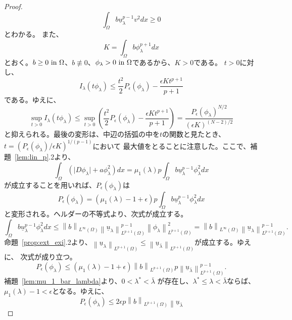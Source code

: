 \begin{proof}
\[ \int_\Omega b
 \underline{u}_\lambda^{p-1} v^2 dx \geq 0
 \]
 とわかる。
 また、
 \begin{equation}
  K = \int_\Omega b \phi_\lambda^{p+1} dx \label{eq:intbphi}
 \end{equation}
 とおく。$b \geq 0 ~\text{in}~ \Omega$、$b \not\equiv 0$、$\phi_\lambda > 0
 ~\text{in}~ \Omega$であるから、$K > 0$である。
 $t > 0$に対し、
 \[
 I_\lambda (t \phi_\lambda) \leq \frac{t^2}{2} P_\epsilon
 (\phi_\lambda) - \frac{\epsilon K t^{p+1}}{p+1}
 \]
 である。ゆえに、
\begin{equation}
 \sup_{t > 0} I_\lambda (t \phi_\lambda) \leq \sup_{t > 0} \left(
                                                            \frac{t^2}{2} P_\epsilon 
 (\phi_\lambda) - \frac{\epsilon K t^{p+1}}{p+1} \right) =  
 \frac{P_\epsilon(\phi_\lambda)^{N/2}}{\left( \epsilon K
                                         \right)^{(N-2)/2}}
 \label{eq:supIlambdatphi1} 
\end{equation}
と抑えられる。最後の変形は、中辺の括弧の中を$t$の関数と見たとき、
$t = ( P_\epsilon(\phi_\lambda) / \epsilon K )^{1/(p-1)}$において
最大値をとることに注意した。ここで、補題~\ref{lem:lin_p}.2より、
\[
 \int_\Omega \left( \lvert D\phi_\lambda \rvert + a \phi_\lambda^2
 \right) dx = \mu_1(\lambda) p \int_\Omega b
 \underline{u}_\lambda^{p-1} \phi_\lambda^2 dx
\]
が成立することを用いれば、$P_\epsilon(\phi_\lambda)$は
\[
 P_\epsilon(\phi_\lambda) = \left( \mu_1(\lambda) - 1 + \epsilon
 \right) p \int_\Omega b \underline{u}_\lambda^{p-1} \phi_\lambda^2 dx
\]
と変形される。ヘルダーの不等式より、次式が成立する。
\[
 \int_\Omega b \underline{u}_\lambda^{p-1} \phi_\lambda^2 dx \leq
 \left\| b \right\|_{L^\infty(\Omega)} \left\| \underline{u}_\lambda
 \right\|_{L^{p+1}(\Omega)}^{p-1} \left\| \phi_\lambda
 \right\|_{L^{p+1}(\Omega)}^2 = \left\| b \right\|_{L^\infty(\Omega)}
 \left\| \underline{u}_\lambda 
 \right\|_{L^{p+1}(\Omega)}^{p-1}.
\]
命題~\ref{prop:ext_exi}.2より、$\left\| \underline{u}_\lambda 
 \right\|_{L^{p+1}(\Omega)} \leq \left\| \underline{u}_{\bar{\lambda}} 
 \right\|_{L^{p+1}(\Omega)}$が成立する。ゆえに、
次式が成り立つ。
\[
 P_\epsilon(\phi_\lambda) \leq (\mu_1(\lambda) - 1 + \epsilon) \left\|
 b \right\|_{L^{p+1}(\Omega)} p \left\| \underline{u}_{\bar{\lambda}}
 \right\|_{L^{p+1}(\Omega)}^{p-1}.
\]
補題~\ref{lem:mu_1_bar_lambda}より、$0 < \lambda^{*} < \bar{\lambda}$
が存在し、$\lambda^{*} \leq \lambda < \bar{\lambda}$ならば、
$\mu_1(\lambda) - 1 < \epsilon$となる。ゆえに、
\[
 P_\epsilon(\phi_\lambda) \leq 2\epsilon p \left\|
 b \right\|_{L^{p+1}(\Omega)} \left\| \underline{u}_{\bar{\lambda}}
\]
\end{proof}
